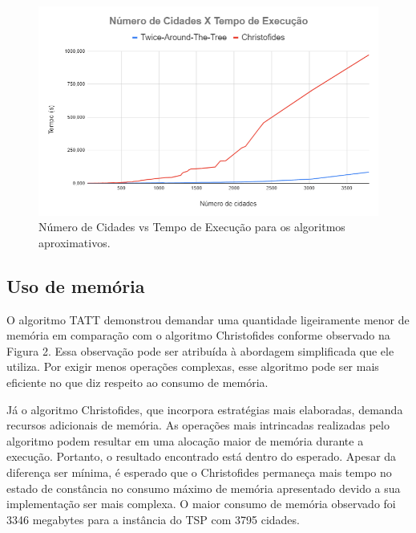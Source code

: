 \documentclass[12pt]{article}
\begin{document}
\begin{figure}[h]
\centering
\includegraphics[width=\textwidth]{Time.png}
\caption{Número de Cidades vs Tempo de Execução para os algoritmos aproximativos.}
\label{fig:time}
\end{figure}

\subsection{Uso de memória}

O algoritmo TATT demonstrou demandar uma quantidade ligeiramente menor de memória em comparação com o algoritmo Christofides conforme observado na Figura 2. Essa observação pode ser atribuída à abordagem simplificada que ele utiliza. Por exigir menos operações complexas, esse algoritmo pode ser mais eficiente no que diz respeito ao consumo de memória. 

Já o algoritmo Christofides, que incorpora estratégias mais elaboradas, demanda recursos adicionais de memória. As operações mais intrincadas realizadas pelo algoritmo podem resultar em uma alocação maior de memória durante a execução. Portanto, o resultado encontrado está dentro do esperado. Apesar da diferença ser mínima, é esperado que o Christofides permaneça mais tempo no estado de constância no consumo máximo de memória apresentado devido a sua implementação ser mais complexa. O maior consumo de memória observado foi 3346 megabytes para a instância do TSP com 3795 cidades.
\end{document}
